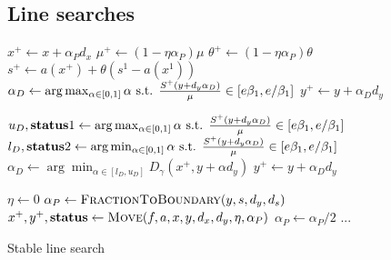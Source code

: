 \documentclass{article}
\begin{document}
\subsection{Line searches}

\begin{algorithm}[H]
\begin{algorithmic}
\State $x^{+} \gets x + \alpha_{P} d_{x}$
\State $\mu^{+} \gets (1 - \eta \alpha_{P}) \mu$
\State $\theta^{+} \gets (1 - \eta \alpha_{P}) \theta$
\State $s^{+} \gets a(x^{+}) + \theta (  s^{1} - a(x^{1}) )$
\State $\alpha_{D} \gets \arg \max_{\alpha \in [0,1]} {\alpha} \text{ s.t. } \frac{S^{+} (y + d_{y} \alpha_{D})}{\mu} \in [ e \beta_{1}, e / \beta_{1} ] $
\State $y^{+} \gets y + \alpha_{D} d_{y}$
\EndFunction
\end{algorithmic}
\end{algorithm}

\begin{algorithm}[H]
\begin{algorithmic}
\State $u_{D}, \textbf{status}1 \gets \arg \max_{\alpha \in [0,1]} {\alpha} \text{ s.t. } \frac{S^{+} (y + d_{y} \alpha_{D})}{\mu} \in [ e \beta_{1}, e / \beta_{1} ] $
\State $l_{D}, \textbf{status}2 \gets \arg \min_{\alpha \in [0,1]} {\alpha} \text{ s.t. } \frac{S^{+} (y + d_{y} \alpha_{D})}{\mu} \in [ e \beta_{1}, e / \beta_{1} ] $
\State $\alpha_{D} \gets \arg \min_{ \alpha \in [l_{D}, u_{D}] }{ D_{\gamma}(x^{+}, y  + \alpha d_{y} ) }$
\State $y^{+} \gets y + \alpha_{D} d_{y}$
\EndFunction
\end{algorithmic}
\end{algorithm}





\begin{algorithm}[H]
\begin{algorithmic}
\State $\eta \gets 0$
\State $\alpha_{P} \gets \Call{FractionToBoundary}{y, s, d_{y}, d_{s} }$
\State  $x^{+}, y^{+}, \status \gets \Call{Move}{\obj, \cons, x, y, d_{x}, d_{y}, \eta, \alpha_{P}}$
\If{$\status = \feasible$}
\State {}
\Else
\State 
\EndIf
\Else
\State $\alpha_{P} \gets \alpha_{P} /2$
\EndIf
\State ...
\EndFor
\EndFunction
\end{algorithmic}
\caption{Stable line search}
\end{algorithm}
\end{document}
